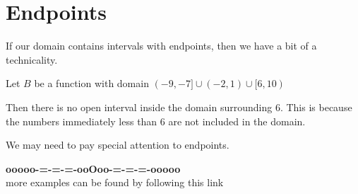 \documentclass{ximera}
\begin{document}
\section*{Endpoints}


If our domain contains intervals with endpoints, then we have a bit of a technicality.

Let $B$ be a function with domain $(-9, -7] \cup (-2, 1) \cup [6, 10)$ 

Then there is no open interval inside the domain surrounding $6$.  This is because the numbers immediately less than $6$ are not included in the domain.


We may need to pay special attention to endpoints.











\begin{onlineOnly}
\begin{center}
\textbf{\textcolor{green!50!black}{ooooo-=-=-=-ooOoo-=-=-=-ooooo}} \\

more examples can be found by following this link\\ 

\end{center}
\end{onlineOnly}
\end{document}
